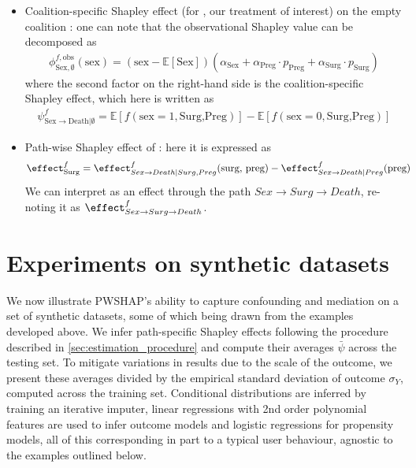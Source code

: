 \begin{itemize}
\begin{align*}
    \end{align*}
    \item Coalition-specific Shapley effect (for , our treatment of interest) on the empty coalition : one can note that the observational Shapley value can be decomposed as
    \begin{align*}
        \phi^{f,\text{obs}}_{\text{Sex},\emptyset}(\text{sex}) = (\text{sex} - \mathbb{E}[\text{Sex}]) (\alpha_\text{Sex} + \alpha_\text{Preg} \cdot p_\text{Preg} + \alpha_\text{Surg} \cdot p_\text{Surg})
    \end{align*}
    where the second factor on the right-hand side is the coalition-specific Shapley effect, which here is written as
    \begin{align*}
        \psi^{f}_{\text{Sex} \rightarrow \text{Death}|\emptyset} = \mathbb{E}[f(\text{sex}=1,\text{Surg,Preg})] - \mathbb{E}[f(\text{sex}=0,\text{Surg,Preg})]
    \end{align*}
    \item Path-wise Shapley effect of  : here it is expressed as
    \begin{align*}
\effect^f_{\text{Surg}} &= \effect^f_{Sex \rightarrow Death | Surg, Preg}(\text{surg, preg})  - \effect^f_{Sex \rightarrow Death| Preg}(\text{preg})
\end{align*}
We can interpret as an effect through the path $Sex \rightarrow Surg \rightarrow Death$, re-noting it as $\effect^f_{Sex \rightarrow Surg \rightarrow Death}$.
\end{itemize}

\vspace*{-0.2cm}

\iffalse
\section{Experiments on synthetic datasets}
\label{sec:exp_synth}
\vspace*{-0.2cm}

We now illustrate PWSHAP's ability to capture confounding and mediation on a set of synthetic datasets, some of which being drawn from the examples developed above. We infer path-specific Shapley effects following the procedure described in \ref{sec:estimation_procedure}  and compute their averages $\bar{\psi}$ across the testing set. To mitigate variations in results due to the scale of the outcome, we present these averages divided by the empirical standard deviation of outcome $\sigma_Y$, computed across the training set. Conditional distributions are inferred by training an iterative imputer, linear regressions with 2nd order polynomial features are used to infer outcome models and logistic regressions for propensity models, all of this corresponding in part to a typical user behaviour, agnostic to the examples outlined below. 

